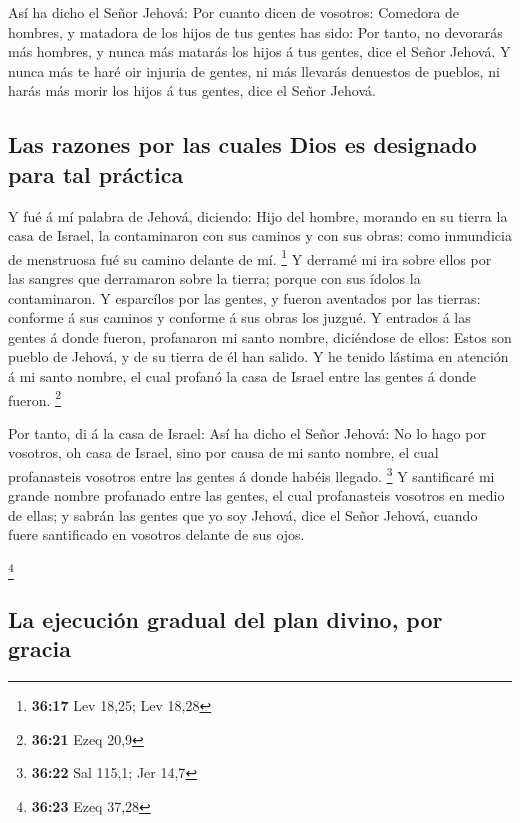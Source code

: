  Así ha dicho el Señor Jehová: Por cuanto dicen de
vosotros: Comedora de hombres, y matadora de los hijos de tus gentes has
sido:  Por tanto, no devorarás más hombres, y nunca más
matarás los hijos á tus gentes, dice el Señor Jehová.  Y
nunca más te haré oir injuria de gentes, ni más llevarás denuestos de
pueblos, ni harás más morir los hijos á tus gentes, dice el Señor
Jehová.

\hypertarget{las-razones-por-las-cuales-dios-es-designado-para-tal-pruxe1ctica}{%
\subsection{Las razones por las cuales Dios es designado para tal
práctica}\label{las-razones-por-las-cuales-dios-es-designado-para-tal-pruxe1ctica}}

 Y fué á mí palabra de Jehová, diciendo: 
Hijo del hombre, morando en su tierra la casa de Israel, la contaminaron
con sus caminos y con sus obras: como inmundicia de menstruosa fué su
camino delante de mí. \footnote{\textbf{36:17} Lev 18,25; Lev 18,28}
 Y derramé mi ira sobre ellos por las sangres que
derramaron sobre la tierra; porque con sus ídolos la contaminaron.
 Y esparcílos por las gentes, y fueron aventados por las
tierras: conforme á sus caminos y conforme á sus obras los juzgué.
 Y entrados á las gentes á donde fueron, profanaron mi
santo nombre, diciéndose de ellos: Estos son pueblo de Jehová, y de su
tierra de él han salido.  Y he tenido lástima en atención
á mi santo nombre, el cual profanó la casa de Israel entre las gentes á
donde fueron. \footnote{\textbf{36:21} Ezeq 20,9}

 Por tanto, di á la casa de Israel: Así ha dicho el Señor
Jehová: No lo hago por vosotros, oh casa de Israel, sino por causa de mi
santo nombre, el cual profanasteis vosotros entre las gentes á donde
habéis llegado. \footnote{\textbf{36:22} Sal 115,1; Jer 14,7}
 Y santificaré mi grande nombre profanado entre las
gentes, el cual profanasteis vosotros en medio de ellas; y sabrán las
gentes que yo soy Jehová, dice el Señor Jehová, cuando fuere santificado
en vosotros delante de sus ojos.

\footnote{\textbf{36:23} Ezeq 37,28}

\hypertarget{la-ejecuciuxf3n-gradual-del-plan-divino-por-gracia}{%
\subsection{La ejecución gradual del plan divino, por
gracia}\label{la-ejecuciuxf3n-gradual-del-plan-divino-por-gracia}}

